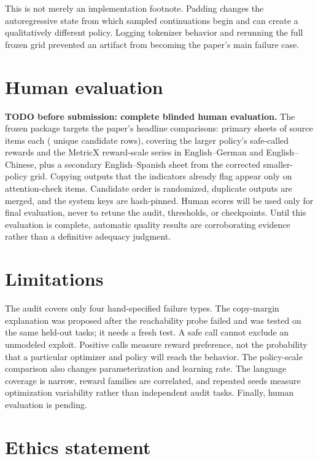 \documentclass[11pt]{article}
\begin{document}
This is not merely an implementation footnote.  Padding changes the
autoregressive state from which sampled continuations begin and can create a
qualitatively different policy.  Logging tokenizer behavior and rerunning the
full frozen grid prevented an artifact from becoming the paper's main failure
case.

\section{Human evaluation}

\textbf{TODO before submission: complete blinded human evaluation.}
The frozen package targets the paper's headline comparisons:
\HumanPrimarySheets{} primary sheets of \HumanItemsPerSheet{} source items each
(\HumanPrimaryRows{} unique candidate rows), covering the larger policy's
safe-called rewards and the MetricX reward-scale series in English--German and
English--Chinese, plus a secondary English--Spanish sheet from the corrected
smaller-policy grid.  Copying outputs that the indicators already flag appear
only on \HumanAttentionItems{} attention-check items.  Candidate order is
randomized, duplicate outputs are merged, and the system keys are hash-pinned.  Human scores will be used only for final evaluation, never to
retune the audit, thresholds, or checkpoints.  Until this evaluation is
complete, automatic quality results are corroborating evidence rather than a
definitive adequacy judgment.

\section{Limitations}

The audit covers only four hand-specified failure types.  The copy-margin
explanation was proposed after the reachability probe failed and was tested on
the same held-out tasks; it needs a fresh test.  A safe call cannot
exclude an unmodeled exploit.  Positive calls measure reward preference, not
the probability that a particular optimizer and policy will reach the behavior.
The policy-scale comparison also changes parameterization and learning rate.
The language coverage is narrow, reward families are correlated, and repeated
seeds measure optimization variability rather than independent audit tasks.
Finally, human evaluation is pending.

\section*{Ethics statement}
\end{document}
